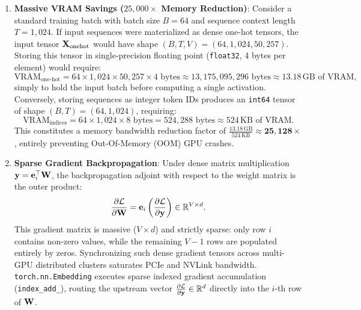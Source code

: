 \documentclass[../../main.tex]{subfiles}
\begin{document}
\begin{enumerate}
    \item \textbf{Massive VRAM Savings ($25{,}000\times$ Memory Reduction)}:
    Consider a standard training batch with batch size $B = 64$ and sequence context length $T = 1{,}024$. If input sequences were materialized as dense one-hot tensors, the input tensor $\mathbf{X}_{\text{onehot}}$ would have shape $(B, T, V) = (64, 1{,}024, 50{,}257)$. Storing this tensor in single-precision floating point (\texttt{float32}, 4 bytes per element) would require:
    \begin{equation}
    \label{eq:vram_blowout}
    \text{VRAM}_{\text{one-hot}} = 64 \times 1{,}024 \times 50{,}257 \times 4 \text{ bytes} \approx 13{,}175{,}095{,}296 \text{ bytes} \approx 13.18\,\text{GB of VRAM},
    \end{equation}
    simply to hold the input batch before computing a single activation.
    Conversely, storing sequences as integer token IDs produces an \texttt{int64} tensor of shape $(B, T) = (64, 1{,}024)$, requiring:
    \begin{equation}
    \label{eq:vram_compact}
    \text{VRAM}_{\text{indices}} = 64 \times 1{,}024 \times 8 \text{ bytes} = 524{,}288 \text{ bytes} \approx 524\,\text{KB of VRAM}.
    \end{equation}
    This constitutes a memory bandwidth reduction factor of $\frac{13.18\,\text{GB}}{524\,\text{KB}} \approx \mathbf{25{,}128\times}$, entirely preventing Out-Of-Memory (OOM) GPU crashes.

    \item \textbf{Sparse Gradient Backpropagation}:
    Under dense matrix multiplication $\mathbf{y} = \mathbf{e}_i^\top \mathbf{W}$, the backpropagation adjoint with respect to the weight matrix is the outer product:
    \begin{equation}
    \label{eq:gradient_outer_product}
    \frac{\partial \mathcal{L}}{\partial \mathbf{W}} = \mathbf{e}_i \left( \frac{\partial \mathcal{L}}{\partial \mathbf{y}} \right) \in \mathbb{R}^{V \times d}.
    \end{equation}
    This gradient matrix is massive ($V \times d$) and strictly sparse: only row $i$ contains non-zero values, while the remaining $V-1$ rows are populated entirely by zeros. Synchronizing such dense gradient tensors across multi-GPU distributed clusters saturates PCIe and NVLink bandwidth. \texttt{torch.nn.Embedding} executes sparse indexed gradient accumulation (\texttt{index\_add\_}), routing the upstream vector $\frac{\partial \mathcal{L}}{\partial \mathbf{y}} \in \mathbb{R}^d$ directly into the $i$-th row of $\mathbf{W}$.
\end{enumerate}
\end{document}
